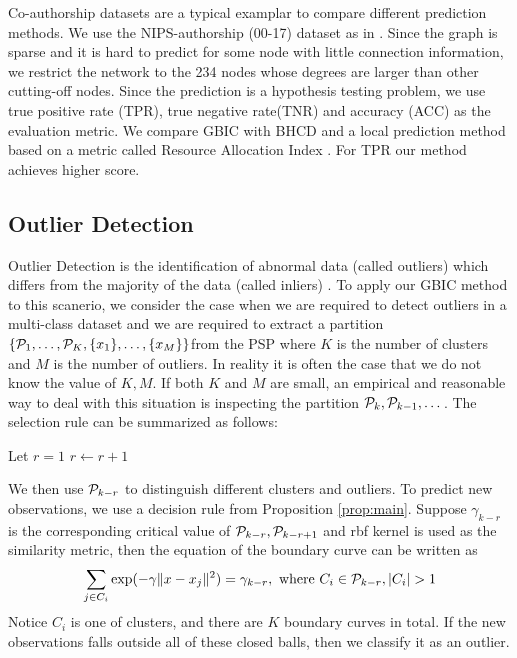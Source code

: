 Co-authorship datasets are a typical examplar to compare different prediction methods. We use the NIPS-authorship (00-17) dataset as in \cite{RN23}.
Since the graph is sparse and it is hard to predict for some node with little connection information, we restrict the network to the 234 nodes whose degrees are larger than other cutting-off nodes. Since the prediction  is a hypothesis testing problem, we use true positive rate (TPR), true negative rate(TNR) and accuracy (ACC) as the evaluation metric. We compare GBIC with BHCD and a local prediction method based on a metric called Resource Allocation Index \citep{zhou2009predicting}. For TPR our method achieves higher score.
\begin{table}
\centering

\end{table}



\subsection{Outlier Detection}\label{subsec:od}
Outlier Detection is the identification of abnormal data (called outliers) which differs from the majority of the data (called inliers) \citep{grubbs1969procedures}.
To apply our GBIC method to this scanerio, we consider the case when we are required to detect outliers in a multi-class dataset and we are required to
extract a partition $\{\P_1, \dots, \P_K, \{x_1\}, \dots, \{x_M\}\}$from the PSP where $K$ is the number of clusters and $M$ is the number of outliers.
In reality it is often the case that we do not know the value of $K, M$.
If both $K$ and $M$ are small, an empirical and reasonable way to deal with this situation is inspecting the partition $\P_k, \P_{k-1}, \dots$.
The selection rule can be summarized as follows:

\begin{algorithmic}
\STATE Let $r=1$
\STATE $r\leftarrow r+1$
\ENDWHILE
\end{algorithmic}

We then use $\P_{k-r}$ to distinguish different clusters and outliers. To predict new observations,  we use a decision rule from Proposition \ref{prop:main}.
Suppose $\gamma_{k-r}$ is the corresponding critical value of $\P_{k-r}, \P_{k-r+1}$ and rbf kernel is used as the similarity metric, then the equation of
the boundary curve can be written as
\begin{equation}
\sum_{j \in C_i} \exp(-\gamma \norm{x - x_j}^2)= \gamma_{k-r}, \text{ where } C_i \in \P_{k-r},  \abs{C_i} > 1
\end{equation}
Notice $C_i$ is one of clusters, and there are $K$ boundary curves in total. If the new observations falls outside all of these closed balls, then we classify it as an outlier.

